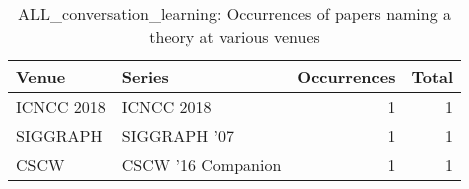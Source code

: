 \begin{table*}[t]
\begin{tabular}{llrr}
Venue & Series & Occurrences & Total\\\hline
\multirow{1}{*}{ICNCC 2018} & ICNCC 2018 & 1 & \multirow{1}{*}{1}\\
\multirow{1}{*}{SIGGRAPH } & SIGGRAPH '07 & 1 & \multirow{1}{*}{1}\\
\multirow{1}{*}{CSCW } & CSCW '16 Companion & 1 & \multirow{1}{*}{1}\\
\end{tabular}
\caption{ALL\_conversation\_learning: Occurrences of papers naming a theory at various venues}
\end{table*}
